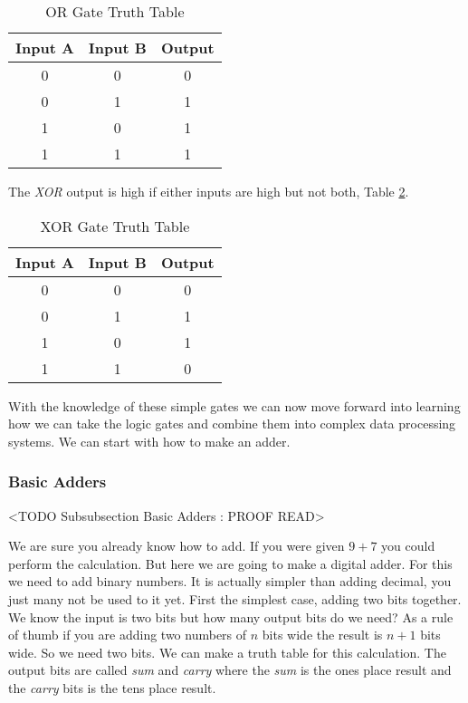 \begin{table}[h!]  
\begin{center}    
\caption{OR Gate Truth Table} 
\label{tab:ttor} 
\begin{tabular}{|c|c|c|}  
\textbf{Input A} & \textbf{Input B} & \textbf{Output}\\  
\hline  
0 & 0 & 0\\  
0 & 1 & 1\\  
1 & 0 & 1\\  
1 & 1 & 1\\ 
\end{tabular}  
\end{center}
\end{table}

The \emph{XOR} output is high if either inputs are high but not both, Table \ref{tab:ttxor}.

\begin{table}[h!]  
\begin{center}    
\caption{XOR Gate Truth Table} 
\label{tab:ttxor} 
\begin{tabular}{|c|c|c|}  
\textbf{Input A} & \textbf{Input B} & \textbf{Output}\\  
\hline  
0 & 0 & 0\\  
0 & 1 & 1\\  
1 & 0 & 1\\  
1 & 1 & 0\\ 
\end{tabular}  
\end{center}
\end{table}

With the knowledge of these simple gates we can now move forward into learning how we can take the logic gates and combine them into complex data processing systems. We can start with how to make an adder.



	
\subsubsection{Basic Adders}
	<TODO Subsubsection  Basic Adders : PROOF READ>

We are sure you already know how to add. If you were given $9+7$ you could perform the calculation. But here we are going to make a digital adder. For this we need to add binary numbers. It is actually simpler than adding decimal, you just many not be used to it yet. First the simplest case, adding two bits together. We know the input is two bits but how many output bits do we need? As a rule of thumb if you are adding two numbers of $n$ bits wide the result is $n+1$ bits wide. So we need two bits. We can make a truth table for this calculation. The output bits are called \emph{sum} and \emph{carry} where the \emph{sum} is the ones place result and the \emph{carry} bits is the tens place result.

